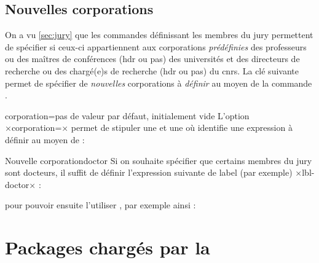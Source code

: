 \subsection{Nouvelles corporations}\label{sec:corporations}

On a vu \vref{sec:jury} que les commandes définissant les membres du jury
permettent de spécifier si ceux-ci appartiennent aux corporations
\emph{prédéfinies} des professeurs ou des maîtres de conférences (\gls{hdr} ou
pas) des universités et des directeurs de recherche ou des chargé(e)s de
recherche (\gls{hdr} ou pas) du \gls{cnrs}. La clé 
suivante permet de spécifier de \emph{nouvelles} corporations à \emph{définir}
au moyen de la commande .

\begin{docKey}{corporation}{=}{pas de
    valeur par défaut, initialement vide}
  L'option ×corporation=× permet de stipuler une  et une  où  identifie
  une expression à définir au moyen de :
\begin{preamblecode}[title=Par exemple dans le \File{\configurationfile}]
\end{preamblecode}
\end{docKey}

\begin{dbexample}{Nouvelle corporation}{doctor}
  Si on souhaite spécifier que certains membres du jury sont docteurs, il
  suffit de définir  l'expression suivante de label (par
  exemple) ×lbl-doctor× :
\begin{preamblecode}[title=Par exemple dans le \File{\configurationfile}]
\end{preamblecode}
  pour pouvoir ensuite l'utiliser , par
  exemple ainsi :
\begin{bodycode}
\end{bodycode}
\end{dbexample}

\section{Packages chargés par la \yatcl}

